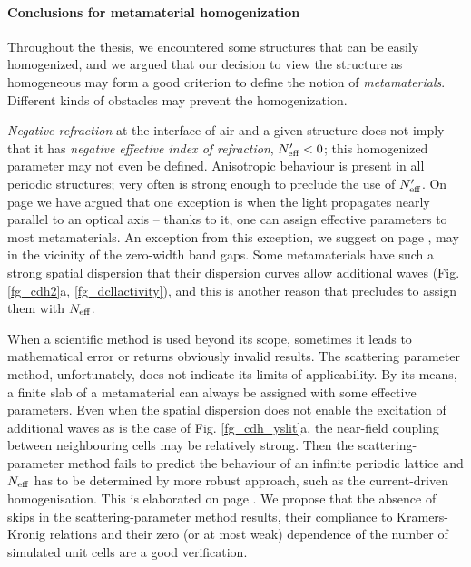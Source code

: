 \paragraph{Conclusions for metamaterial homogenization}
Throughout the thesis, we encountered some structures that can be easily homogenized, and we argued that our decision to view the structure as homogeneous may form a good criterion to define the notion of \textit{metamaterials}. Different kinds of obstacles may prevent the homogenization.

\textit{Negative refraction} at the interface of air and a given structure does not imply that it has \textit{negative effective index of refraction}, $N_{\text{eff} }'<0$; this homogenized parameter may not even be defined. Anisotropic behaviour is present in all periodic structures; very often is strong enough to preclude the use of $N_{\text{eff} }'$. On page \pageref{indexofrefraction} we have argued that one exception is when the light propagates nearly parallel to an optical axis -- thanks to it, one can assign effective parameters to most metamaterials. An exception from this exception, we suggest on page \pageref{diracpoint}, may in the vicinity of the zero-width band gaps. 
Some metamaterials have such a strong spatial dispersion that their dispersion curves allow additional waves (Fig. \ref{fg_cdh2}a, \ref{fg_dcllactivity}), and this is another reason that precludes to assign them with $N_{\text{eff} }$. 

When a scientific method is used beyond its scope, sometimes it leads to mathematical error or returns obviously invalid results. The scattering parameter method, unfortunately, does not indicate its limits of applicability. By its means, a finite slab of a metamaterial can always be assigned with some effective parameters. Even when the spatial dispersion does not enable the excitation of additional waves as is the case of Fig. \ref{fg_cdh_yslit}a, the near-field coupling between neighbouring cells may be relatively strong. Then the scattering-parameter method fails to predict the behaviour of an infinite periodic lattice and $N_{\text{eff} }$ has to be determined by more robust approach, such as the current-driven homogenisation. This is elaborated on page \pageref{sparamweaknesses}. We propose that the absence of skips in the scattering-parameter method results, their compliance to Kramers-Kronig relations and their zero (or at most weak) dependence of the number of simulated unit cells are a good verification.

